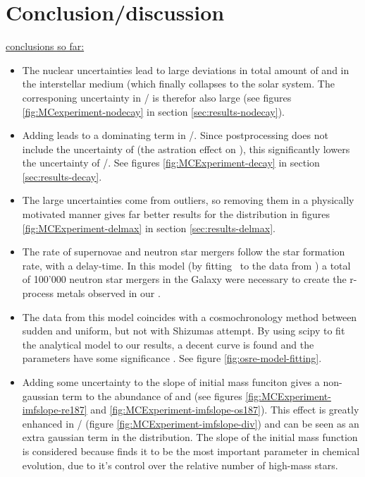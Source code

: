 \chapter{Conclusion/discussion}
\label{sec:conclusion}

\underline{conclusions so far:}
\begin{itemize}
\item The nuclear uncertainties lead to large deviations in total amount of  and  in the interstellar medium (which finally collapses to the solar system. The corresponing uncertainty in / is therefor also large (see figures \ref{fig:MCexperiment-nodecay} in section \ref{sec:results-nodecay}).
\item Adding \betadecay leads to a dominating term in /. Since postprocessing does not include the uncertainty of \betadecay (the astration effect on ), this significantly lowers the uncertainty of /. See figures \ref{fig:MCExperiment-decay} in section \ref{sec:results-decay}.
\item The large uncertainties come from outliers, so removing them in a physically motivated manner gives far better results for the distribution in figures \ref{fig:MCExperiment-delmax} in section \ref{sec:results-delmax}.
\item The rate of supernovae and neutron star mergers follow the star formation rate, with a delay-time. In this model (by fitting \omegamodel\ to the data from \eris) a total of 100'000 neutron star mergers in the Galaxy were necessary to create the r-process metals observed in our \sos.
\item The data from this model coincides with a cosmochronology method between sudden and uniform, but not with Shizumas attempt. By using scipy to fit the analytical model to our results, a decent curve is found and the parameters have some significance . See figure \ref{fig:osre-model-fitting}.
\item Adding some uncertainty to the slope of initial mass funciton gives a non-gaussian term to the abundance of  and  (see figures \ref{fig:MCExperiment-imfslope-re187} and \ref{fig:MCExperiment-imfslope-os187}). This effect is greatly enhanced in / (figure \ref{fig:MCExperiment-imfslope-div}) and can be seen as an extra gaussian term in the distribution. The slope of the initial mass function is considered because  finds it to be the most important parameter in chemical evolution, due to it's control over the relative number of high-mass stars.

\end{itemize}
